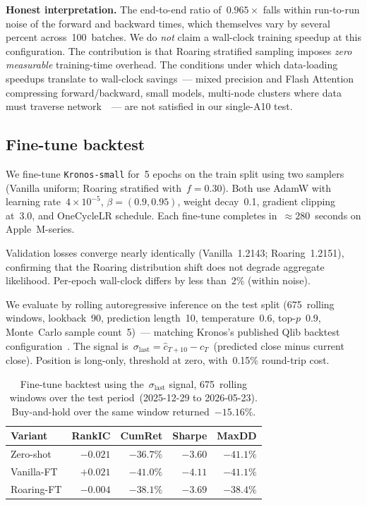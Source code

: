 \documentclass[10pt]{article}
\begin{document}
\textbf{Honest interpretation.} The end-to-end ratio of~$0.965\times$
falls within run-to-run noise of the forward and backward times,
which themselves vary by several percent across~100~batches. We do
\emph{not} claim a wall-clock training speedup at this
configuration. The contribution is that Roaring stratified sampling
imposes \emph{zero measurable} training-time overhead. The
conditions under which data-loading speedups translate to wall-clock
savings~--- mixed precision and Flash Attention compressing
forward/backward, small models, multi-node clusters where data must
traverse network~\citep{megascale2024,
computational_bottlenecks2024}~--- are not satisfied in our
single-A10 test.

\subsection{Fine-tune backtest}\label{sec:backtest}

We fine-tune \texttt{Kronos-small} for~5 epochs on the train split
using two samplers (Vanilla uniform; Roaring stratified
with~$f=0.30$). Both use AdamW with learning rate~$4\times10^{-5}$,
$\beta=(0.9, 0.95)$, weight decay~0.1, gradient clipping at~3.0, and
OneCycleLR schedule. Each fine-tune completes
in~$\approx 280$~seconds on Apple~M-series.

Validation losses converge nearly identically (Vanilla~1.2143;
Roaring~1.2151), confirming that the Roaring distribution shift does
not degrade aggregate likelihood. Per-epoch wall-clock differs by
less than~2\% (within noise).

We evaluate by rolling autoregressive inference on the test split
(675~rolling windows, lookback~90, prediction length~10,
temperature~0.6, top-$p$~0.9, Monte~Carlo sample count~5)~---
matching Kronos's published Qlib backtest
configuration~\citep{kronos2025}. The signal
is~$\sigma_{\text{last}} = \hat{c}_{T+10} - c_T$~(predicted close
minus current close). Position is long-only, threshold at zero,
with~0.15\% round-trip cost.

\begin{table}[t]
\centering
\caption{Fine-tune backtest using the~$\sigma_{\text{last}}$ signal,
675~rolling windows over the test
period~(2025-12-29 to 2026-05-23). Buy-and-hold over the same window
returned~$-15.16\%$.}\label{tab:backtest}
\begin{tabular}{lrrrr}
\toprule
Variant & RankIC & CumRet & Sharpe & MaxDD \\
\midrule
Zero-shot   & $-0.021$ & $-36.7\%$ & $-3.60$ & $-41.1\%$ \\
Vanilla-FT  & $+0.021$ & $-41.0\%$ & $-4.11$ & $-41.1\%$ \\
Roaring-FT  & $-0.004$ & $-38.1\%$ & $-3.69$ & $-38.4\%$ \\
\bottomrule
\end{tabular}
\end{table}
\end{document}
